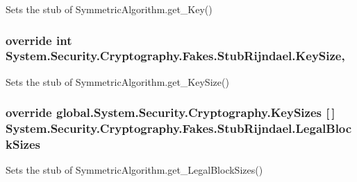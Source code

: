 Sets the stub of Symmetric\-Algorithm.\-get\-\_\-\-Key()

\hypertarget{class_system_1_1_security_1_1_cryptography_1_1_fakes_1_1_stub_rijndael_adde7919794b7a68f56e8d64f4119559e}{
\subsubsection[{Key\-Size}]{\setlength{\rightskip}{0pt plus 5cm}override int System.\-Security.\-Cryptography.\-Fakes.\-Stub\-Rijndael.\-Key\-Size\hspace{0.3cm}{\ttfamily [get]}, {\ttfamily [set]}}}\label{class_system_1_1_security_1_1_cryptography_1_1_fakes_1_1_stub_rijndael_adde7919794b7a68f56e8d64f4119559e}


Sets the stub of Symmetric\-Algorithm.\-get\-\_\-\-Key\-Size()

\hypertarget{class_system_1_1_security_1_1_cryptography_1_1_fakes_1_1_stub_rijndael_a35b1caf60f73cf712bb797a5054461c0}{
\subsubsection[{Legal\-Block\-Sizes}]{\setlength{\rightskip}{0pt plus 5cm}override global.\-System.\-Security.\-Cryptography.\-Key\-Sizes \mbox{[}$\,$\mbox{]} System.\-Security.\-Cryptography.\-Fakes.\-Stub\-Rijndael.\-Legal\-Block\-Sizes\hspace{0.3cm}{\ttfamily [get]}}}\label{class_system_1_1_security_1_1_cryptography_1_1_fakes_1_1_stub_rijndael_a35b1caf60f73cf712bb797a5054461c0}


Sets the stub of Symmetric\-Algorithm.\-get\-\_\-\-Legal\-Block\-Sizes()

